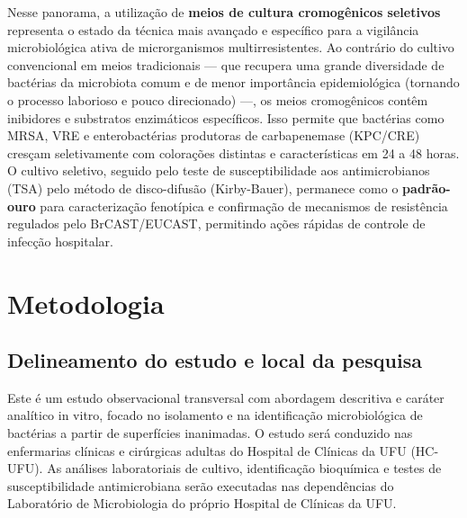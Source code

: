 \documentclass[12pt,a4paper]{article}
\begin{document}
Nesse panorama, a utilização de \textbf{meios de cultura cromogênicos seletivos} representa o estado da técnica mais avançado e específico para a vigilância microbiológica ativa de microrganismos multirresistentes. Ao contrário do cultivo convencional em meios tradicionais --- que recupera uma grande diversidade de bactérias da microbiota comum e de menor importância epidemiológica (tornando o processo laborioso e pouco direcionado) ---, os meios cromogênicos contêm inibidores e substratos enzimáticos específicos. Isso permite que bactérias como MRSA, VRE e enterobactérias produtoras de carbapenemase (KPC/CRE) cresçam seletivamente com colorações distintas e características em 24 a 48 horas. O cultivo seletivo, seguido pelo teste de susceptibilidade aos antimicrobianos (TSA) pelo método de disco-difusão (Kirby-Bauer), permanece como o \textbf{padrão-ouro} para caracterização fenotípica e confirmação de mecanismos de resistência regulados pelo BrCAST/EUCAST, permitindo ações rápidas de controle de infecção hospitalar.
\newpage

\section{Metodologia}

\subsection{Delineamento do estudo e local da pesquisa}
Este é um estudo observacional transversal com abordagem descritiva e caráter analítico in vitro, focado no isolamento e na identificação microbiológica de bactérias a partir de superfícies inanimadas. O estudo será conduzido nas enfermarias clínicas e cirúrgicas adultas do Hospital de Clínicas da UFU (HC-UFU). As análises laboratoriais de cultivo, identificação bioquímica e testes de susceptibilidade antimicrobiana serão executadas nas dependências do Laboratório de Microbiologia do próprio Hospital de Clínicas da UFU.
\end{document}
